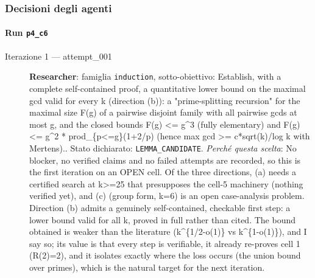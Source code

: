 \documentclass[11pt,a4paper]{article}
\begin{document}
\subsubsection{Decisioni degli agenti}
\paragraph{Run \texttt{p4\_c6}}
\begin{description}
\item[Iterazione 1 — attempt\_001]
\textbf{Researcher}: famiglia \texttt{induction}, sotto-obiettivo: Establish, with a complete self-contained proof, a quantitative lower bound on the maximal gcd valid for every k (direction (b)): a "prime-splitting recursion" for the maximal size F(g) of a pairwise disjoint family with all pairwise gcds at most g, and the closed bounds F(g) \textless{}= g\textasciicircum{}3 (fully elementary) and F(g) \textless{}= g\textasciicircum{}2 * prod\_\{p\textless{}=g\}(1+2/p) (hence max gcd \textgreater{}= c*sqrt(k)/log k with Mertens).. Stato dichiarato: \texttt{LEMMA\_CANDIDATE}.
\emph{Perché questa scelta}: No blocker, no verified claims and no failed attempts are recorded, so this is the first iteration on an OPEN cell. Of the three directions, (a) needs a certified search at k\textgreater{}=25 that presupposes the cell-5 machinery (nothing verified yet), and (c) (group form, k=6) is an open case-analysis problem. Direction (b) admits a genuinely self-contained, checkable first step: a lower bound valid for all k, proved in full rather than cited. The bound obtained is weaker than the literature (k\textasciicircum{}\{1/2-o(1)\} vs k\textasciicircum{}\{1-o(1)\}), and I say so; its value is that every step is verifiable, it already re-proves cell 1 (R(2)=2), and it isolates exactly where the loss occurs (the union bound over primes), which is the natural target for the next iteration.

\end{description}
\end{document}
